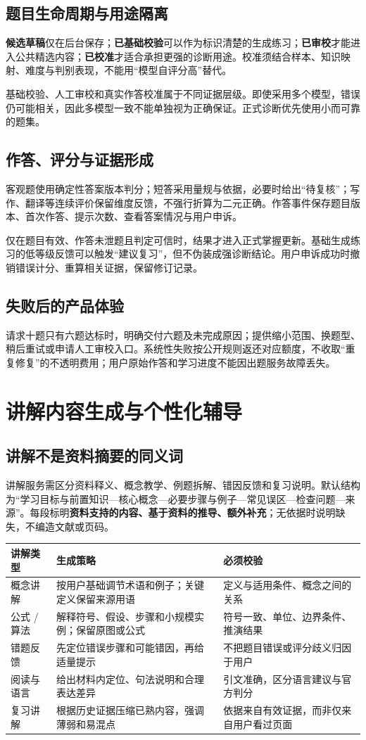 \documentclass[UTF8,a4paper,11pt,fontset=none]{ctexart}
\newcommand{\cth}[1]{\textbf{\sffamily #1}}
\newcommand{\newsec}[1]{\clearpage\section{#1}}
\newenvironment{tbl}{\par\vspace{3pt}\small\noindent\ignorespaces}{\unskip\par\vspace{5pt}}
\begin{document}
\subsection{题目生命周期与用途隔离}
\textbf{候选草稿}仅在后台保存；\textbf{已基础校验}可以作为标识清楚的生成练习；\textbf{已审校}才能进入公共精选内容；\textbf{已校准}才适合承担更强的诊断用途。校准须结合样本、知识映射、难度与判别表现，不能用“模型自评分高”替代。

基础校验、人工审校和真实作答校准属于不同证据层级。即使采用多个模型，错误仍可能相关，因此多模型一致不能单独视为正确保证。正式诊断优先使用小而可靠的题集。

\subsection{作答、评分与证据形成}
客观题使用确定性答案版本判分；短答采用量规与依据，必要时给出“待复核”；写作、翻译等连续评价保留维度反馈，不强行折算为二元正确。作答事件保存题目版本、首次作答、提示次数、查看答案情况与用户申诉。

仅在题目有效、作答未泄题且判定可信时，结果才进入正式掌握更新。基础生成练习的低等级反馈可以触发“建议复习”，但不伪装成强诊断结论。用户申诉成功时撤销错误计分、重算相关证据，保留修订记录。

\subsection{失败后的产品体验}
请求十题只有六题达标时，明确交付六题及未完成原因；提供缩小范围、换题型、稍后重试或申请人工审校入口。系统性失败按公开规则返还对应额度，不收取“重复修复”的不透明费用；用户原始作答和学习进度不能因出题服务故障丢失。

\newsec{讲解内容生成与个性化辅导}
\subsection{讲解不是资料摘要的同义词}
讲解服务需区分资料释义、概念教学、例题拆解、错因反馈和复习说明。默认结构为“学习目标与前置知识—核心概念—必要步骤与例子—常见误区—检查问题—来源”。每段标明\textbf{资料支持的内容、基于资料的推导、额外补充}；无依据时说明缺失，不编造文献或页码。

\begin{tbl}
\begin{tabularx}{\linewidth}{@{}L{25mm}YY@{}}
\toprule
\cth{讲解类型}&\cth{生成策略}&\cth{必须校验}\\\midrule
概念讲解&按用户基础调节术语和例子；关键定义保留来源用语&定义与适用条件、概念之间的关系\\
公式 / 算法&解释符号、假设、步骤和小规模实例；保留原图或公式&符号一致、单位、边界条件、推演结果\\
错题反馈&先定位错误步骤和可能错因，再给适量提示&不把题目错误或评分歧义归因于用户\\
阅读与语言&给出材料内定位、句法说明和合理表达差异&引文准确，区分语言建议与官方判分\\
复习讲解&根据历史证据压缩已熟内容，强调薄弱和易混点&依据来自有效证据，而非仅来自用户看过页面\\
\bottomrule
\end{tabularx}
\end{tbl}
\end{document}
